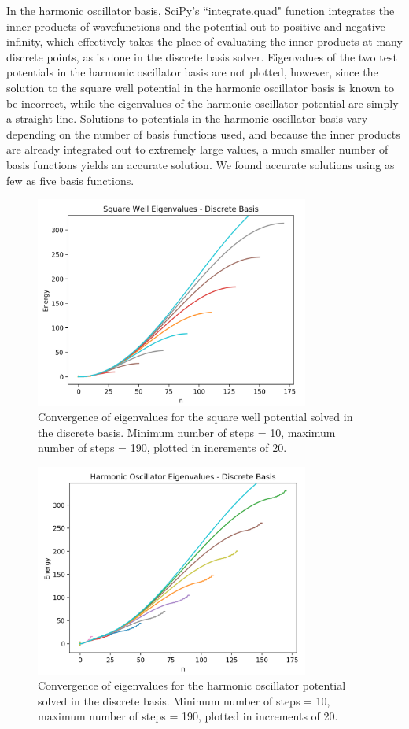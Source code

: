 \documentclass[%
 reprint,
 amsmath,amssymb,
 aps,
]{revtex4-1}
\begin{document}
\noindent In the harmonic oscillator basis, SciPy's ``integrate.quad" function integrates the inner products of wavefunctions and the potential out to positive and negative infinity, which effectively takes the place of evaluating the inner products at many discrete points, as is done in the discrete basis solver.  Eigenvalues of the two test potentials in the harmonic oscillator basis are not plotted, however, since the solution to the square well potential in the harmonic oscillator basis is known to be incorrect, while the eigenvalues of the harmonic oscillator potential are simply a straight line.  Solutions to potentials in the harmonic oscillator basis vary depending on the number of basis functions used, and because the inner products are already integrated out to extremely large values, a much smaller number of basis functions yields an accurate solution.  We found accurate solutions using as few as five basis functions.\\

\begin{figure}
\includegraphics[width=9cm]{DiscreteSquareWellEigenvaluesConvergence}
\caption{Convergence of eigenvalues for the square well potential solved in the discrete basis.  Minimum number of steps = 10, maximum number of steps = 190, plotted in increments of 20.}
\end{figure}
\begin{figure}
\includegraphics[width=9cm]{DiscreteHarmonicOscillatorEigenvaluesConvergence}
\caption{Convergence of eigenvalues for the harmonic oscillator potential solved in the discrete basis.  Minimum number of steps = 10, maximum number of steps = 190, plotted in increments of 20.}
\end{figure}
\end{document}
